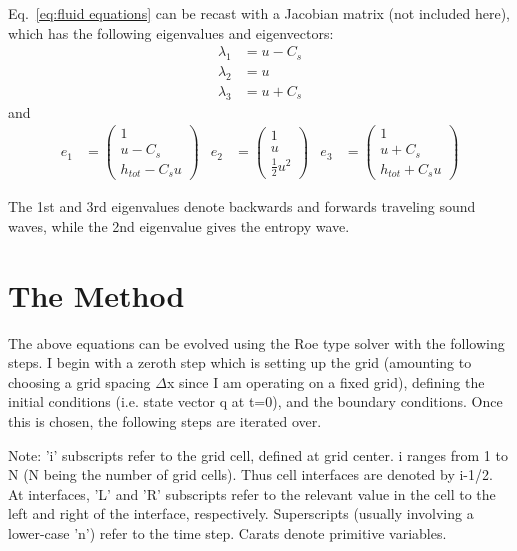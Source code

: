 \documentclass{article}
\begin{document}
Eq.~\eqref{eq:fluid equations} can be recast with a Jacobian matrix (not included here),
which has the following eigenvalues and eigenvectors:
\begin{align}
\label{eq:eigenvalues}
\lambda_1 &= u - C_{s}\\
\lambda_2 &= u\\
\lambda_3 &= u + C_{s}
\end{align}
and 
\begin{align}
\label{eq:eigenvectors}
e_{1} &=
\begin{pmatrix}
1 \\ u - C_s \\ h_{tot} - C_{s} u
\end{pmatrix}
& e_{2} &=
\begin{pmatrix}
1 \\ u \\ \frac{1}{2}u^{2}
\end{pmatrix}
& e_{3} &=
\begin{pmatrix}
1 \\ u + C_s \\ h_{tot} + C_{s} u
\end{pmatrix}
\end{align}

The 1st and 3rd eigenvalues denote backwards and forwards traveling sound waves, while
the 2nd eigenvalue gives the entropy wave.

\section{The Method}
The above equations can be evolved using the Roe type solver with the following steps.
I begin with a zeroth step which is setting up the grid (amounting to choosing a grid
spacing $\Delta$x since I am operating on a fixed grid), defining the initial conditions
(i.e. state vector q at t=0), and the boundary conditions. Once this is chosen, the following
steps are iterated over. 

Note: 'i' subscripts refer to the grid cell, defined at grid center. i ranges from 1 to
N (N being the number of grid cells). Thus cell interfaces are denoted by i-1/2.
At interfaces, 'L' and 'R' subscripts refer to the relevant value in the cell to the left
and right of the interface, respectively. Superscripts (usually involving a lower-case
'n') refer to the time step. Carats denote primitive variables.
\end{document}
